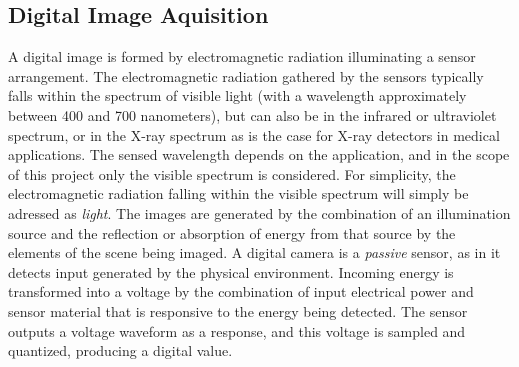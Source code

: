 \subsection{Digital Image Aquisition}
A digital image is formed by electromagnetic radiation illuminating a sensor arrangement. The electromagnetic radiation gathered by the sensors typically falls within the spectrum of visible light (with a wavelength approximately between 400 and 700 nanometers), but can also be in the infrared or ultraviolet spectrum, or in the X-ray spectrum as is the case for X-ray detectors in medical applications. The sensed wavelength depends on the application, and in the scope of this project only the visible spectrum is considered. For simplicity, the electromagnetic radiation falling within the visible spectrum will simply be adressed as \textit{light}. The images are generated by the combination of an illumination source and the reflection or absorption of energy from that source by the elements of the scene being imaged. A digital camera is a \textit{passive} sensor, as in it detects input generated by the physical environment. Incoming energy is transformed into a voltage by the combination of input electrical power and sensor material that is responsive to the energy being detected. The sensor outputs a voltage waveform as a response, and this voltage is sampled and quantized, producing a digital value.

